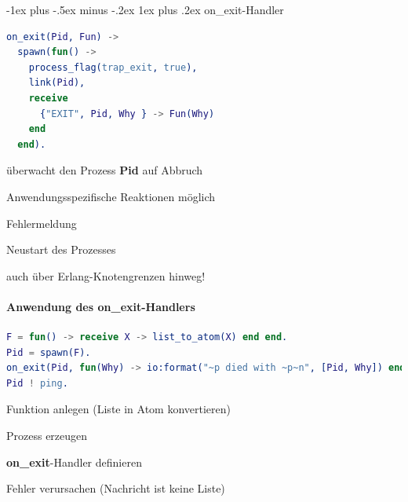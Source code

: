 \documentclass[10pt]{article}
\makeatletter
\renewcommand{\subsubsection}{\@startsection{subsubsection}{3}{0mm}%
                                {-1ex plus -.5ex minus -.2ex}%
                                {1ex plus .2ex}%
                                {\normalfont\small\bfseries}}
\makeatother
\begin{document}
  \subsubsection{on\_exit-Handler}
  \begin{lstlisting}[language=erlang]
on_exit(Pid, Fun) ->
  spawn(fun() ->
    process_flag(trap_exit, true),
    link(Pid),
    receive
      {"EXIT", Pid, Why } -> Fun(Why)
    end
  end).
\end{lstlisting}
  
  \begin{itemize*}
    \item überwacht den Prozess \textbf{Pid} auf Abbruch
    \item Anwendungsspezifische Reaktionen möglich
    \begin{itemize*}
      \item Fehlermeldung
      \item Neustart des Prozesses
    \end{itemize*}
    \item auch über Erlang-Knotengrenzen hinweg!
  \end{itemize*}
  
  \paragraph{Anwendung des on\_exit-Handlers}
  \begin{lstlisting}[language=erlang]
F = fun() -> receive X -> list_to_atom(X) end end.
Pid = spawn(F).
on_exit(Pid, fun(Why) -> io:format("~p died with ~p~n", [Pid, Why]) end).
Pid ! ping.
\end{lstlisting}
  
  \begin{itemize*}
    \item Funktion anlegen (Liste in Atom konvertieren)
    \item Prozess erzeugen
    \item \textbf{on\_exit}-Handler definieren
    \item Fehler verursachen (Nachricht ist keine Liste)
  \end{itemize*}
  
\end{document}
